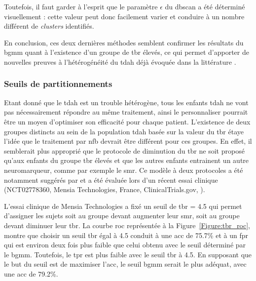 Toutefois, il faut garder à l'esprit que le paramètre $\epsilon$ du \gls{dbscan} a été déterminé visuellement : cette valeur peut donc facilement varier et conduire à
un nombre différent de \textit{clusters} identifiés. 

En conclusion, ces deux dernières méthodes semblent confirmer les résultats du \gls{bgmm} quant à l'existence d'un groupe de \gls{tbr} élevés, ce qui permet 
d'apporter de nouvelles preuves à l'hétérogénéité du \gls{tdah} déjà évoquée dans la littérature \citep{Arns2008, Arns2012, Barry2003, Clarke2011, 
Liechti2013, Loo2013, Loo2018}.

\subsubsection{Seuils de partitionnements}

Etant donné que le \gls{tdah} est un trouble hétérogène, tous les enfants \gls{tdah} ne vont pas nécessairement répondre au même traitement, ainsi le personnaliser 
pourrait être un moyen d'optimiser son efficacité pour chaque patient. L'existence de deux groupes distincts au sein de la 
population \gls{tdah} basée sur la valeur du \gls{tbr} étaye l'idée que le traitement par \gls{nfb} devrait être différent pour ces groupes. En effet, il semblerait
plus approprié que le protocole de diminution du \gls{tbr} ne soit proposé qu'aux enfants du groupe \gls{tbr} élevés et que les autres enfants entrainent un autre
neuromarqueur, comme par exemple le \gls{smr}. Ce modèle à deux protocoles a été notamment suggérés par \citet{Kerson2013, Arns2012} et a été évaluée lors 
d'un récent essai clinique (NCT02778360, Mensia Technologies, France, ClinicalTrials.gov, \citet{Bioulac2019}).

L'essai clinique de Mensia Technologies a fixé un seuil de \gls{tbr} = 4.5 qui permet d'assigner les sujets soit au groupe devant augmenter leur \gls{smr}, soit 
au groupe devant diminuer leur \gls{tbr}. La courbe \gls{roc} représentée à la Figure~\ref{Figure:tbr_roc}, montre que choisir un seuil \gls{tbr} égal à 4.5 conduit
à une \gls{acc} de 75.7\% et à un \gls{fpr} qui est environ deux fois plus faible que celui obtenu avec le seuil déterminé par le \gls{bgmm}. Toutefois, 
le \gls{tpr} est plus faible avec le seuil \gls{tbr} à 4.5. En supposant que le but du seuil est de maximiser l'\gls{acc}, le seuil \gls{bgmm} serait le 
plus adéquat, avec une \gls{acc} de 79.2\%.

